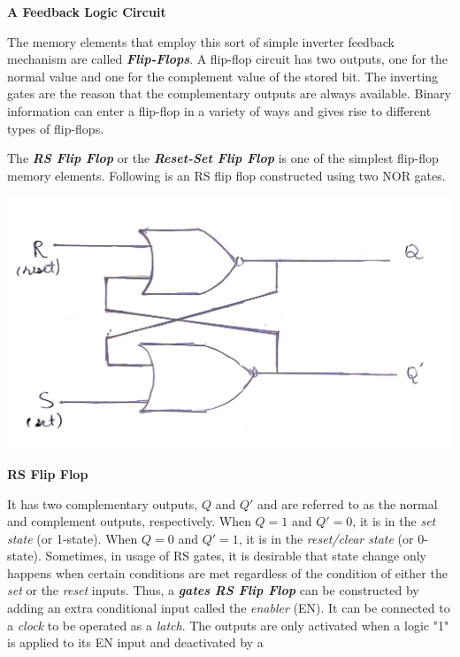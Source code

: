 \begin{center}
    \textbf{A Feedback Logic Circuit}
\end{center}
The memory elements that employ this sort of simple inverter feedback mechanism are called \textbf{\emph{Flip-Flops}}. A flip-flop circuit has two outputs, one for the normal value and one for the complement value of the stored bit. The inverting gates are the reason that the complementary outputs are always available. Binary information can enter a flip-flop in a variety of ways and gives rise to 
different types of flip-flops.
\par
\noindent
The \textbf{\emph{RS Flip Flop}} or the \textbf{\emph{Reset-Set Flip Flop}} is one of the simplest flip-flop memory elements. Following is an RS flip flop constructed using two NOR gates.
\begin{center}
    \includegraphics[scale = 0.14]{Documents/rsff_1.jpg}
\end{center}
\begin{center}
    \textbf{RS Flip Flop}
\end{center}
\noindent
It has two complementary outputs, $Q$ and $Q'$ and are referred to as the normal and complement outputs, 
respectively. When $Q = 1$ and $Q' = 0$, it is in the \emph{set state} (or 1-state). When $Q = 0$ and $Q' = 1$, it is in the \emph{reset/clear state} (or 0-state).
\newline
\noindent 
Sometimes, in usage of RS gates, it is desirable that state change only happens when certain conditions are met regardless of the condition of either the \emph{set} or the \emph{reset} inputs. Thus, a \textbf{\emph{gates RS Flip Flop}} can be constructed by adding an extra conditional input called the \emph{enabler} (EN). It can be connected to a \emph{clock} to be operated as a \emph{latch}. The outputs are only activated when a logic "1" is applied to its EN input and deactivated by a 
